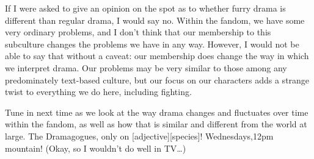 If I were asked to give an opinion on the spot as to whether furry drama is different than regular drama, I would say no. Within the fandom, we have some very ordinary problems, and I don't think that our membership to this subculture changes the problems we have in any way. However, I would not be able to say that without a caveat: our membership does change the way in which we interpret drama. Our problems may be very similar to those among any predominately text-based culture, but our focus on our characters adds a strange twist to everything we do here, including fighting.

Tune in next time as we look at the way drama changes and fluctuates over time within the fandom, as well as how that is similar and different from the world at large. The Dramagogues, only on {[}adjective{]}{[}species{]}! Wednesdays,12pm mountain! (Okay, so I wouldn't do well in TV\ldots{})
